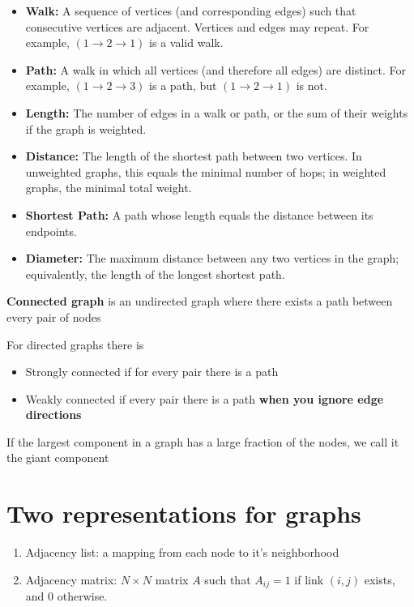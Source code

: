 \begin{itemize}
    \item \textbf{Walk:} A sequence of vertices (and corresponding edges) such that consecutive vertices are adjacent. 
    Vertices and edges may repeat. For example, $(1 \to 2 \to 1)$ is a valid walk.

    \item \textbf{Path:} A walk in which all vertices (and therefore all edges) are distinct. 
    For example, $(1 \to 2 \to 3)$ is a path, but $(1 \to 2 \to 1)$ is not.

    \item \textbf{Length:} The number of edges in a walk or path, or the sum of their weights if the graph is weighted.

    \item \textbf{Distance:} The length of the shortest path between two vertices. 
    In unweighted graphs, this equals the minimal number of hops; in weighted graphs, the minimal total weight.

    \item \textbf{Shortest Path:} A path whose length equals the distance between its endpoints.

    \item \textbf{Diameter:} The maximum distance between any two vertices in the graph; equivalently, 
    the length of the longest shortest path.
\end{itemize}

\textbf{Connected graph} is an undirected graph where there exists a path between 
every pair of nodes

For directed graphs there is 
\begin{itemize}
    \item Strongly connected if for every pair there is a path 
    \item Weakly connected if every pair there is a path \textbf{when you
    ignore edge directions}
\end{itemize}

If the largest component in a graph has a large fraction of the nodes,
we call it the giant component

\section*{Two representations for graphs}

\begin{enumerate}
    \item Adjacency list: a mapping from each node to it's neighborhood
    \item Adjacency matrix: $N \times N$ matrix $A$ such that $A_{ij} = 1$ if link 
    $(i, j)$ exists, and $0$ otherwise. 
\end{enumerate}

